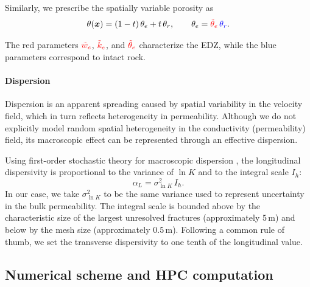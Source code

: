 Similarly, we prescribe the spatially variable porosity as
\begin{equation}
    \label{eq:edz_por}
    \theta({\bm{x}}) = (1-t)\,\theta_e + t\,\theta_r,
    \qquad
    \theta_e = {\color{red}\tilde{\theta}_e}\,{\color{blue}\theta_r}.
\end{equation}

The red parameters ${\color{red}\tilde{w}_e}$, ${\color{red}\tilde{k}_e}$, and ${\color{red}\tilde{\theta}_e}$ characterize the
EDZ, while the blue parameters correspond to intact rock.

\paragraph{Dispersion}
Dispersion is an apparent spreading caused by spatial variability in the
velocity field, which in turn reflects heterogeneity in permeability. Although
we do not explicitly model random spatial heterogeneity in the conductivity
(permeability) field, its macroscopic effect can be represented through an
effective dispersion.

Using first-order stochastic theory for macroscopic dispersion
\cite{Zech_Evidence_2023}, the longitudinal dispersivity is proportional to the
variance of $\ln K$ and to the integral scale $I_h$:
\begin{equation}
    \alpha_L = \sigma_{\ln K}^2\, I_h .
\end{equation}
In our case, we take $\sigma_{\ln K}^2$ to be the same variance used to
represent uncertainty in the bulk permeability. The integral scale is bounded
above by the characteristic size of the largest unresolved fractures
(approximately $5\,\mathrm{m}$) and below by the mesh size
(approximately $0.5\,\mathrm{m}$). Following a common rule of thumb, we set the
transverse dispersivity to one tenth of the longitudinal value.

\subsection{Numerical scheme and HPC computation}

